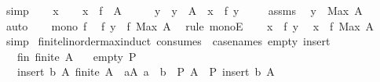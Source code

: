 \begin{isabellebody}
\ simp\isanewline
\ \ \isamarkupfalse%
\ x\isanewline
\ \ \isamarkupfalse%
\ {\isachardoublequoteopen}x\ {\isasymin}\ f\ {\isacharbackquote}{\kern0pt}\ A{\isachardoublequoteclose}\isanewline
\ \ \isamarkupfalse%
\ \isamarkupfalse%
\ y\ \ {\isachardoublequoteopen}y\ {\isasymin}\ A{\isachardoublequoteclose}\ \ {\isachardoublequoteopen}x\ {\isacharequal}{\kern0pt}\ f\ y{\isachardoublequoteclose}\ \isacommand{{\isachardot}{\kern0pt}{\isachardot}{\kern0pt}}\isamarkupfalse%
\isanewline
\ \ \isamarkupfalse%
\ assms\ \isamarkupfalse%
\ {\isachardoublequoteopen}y\ {\isasymle}\ Max\ A{\isachardoublequoteclose}\ \isamarkupfalse%
\ auto\isanewline
\ \ \isamarkupfalse%
\ {\isacartoucheopen}mono\ f{\isacartoucheclose}\ \isamarkupfalse%
\ {\isachardoublequoteopen}f\ y\ {\isasymle}\ f\ {\isacharparenleft}{\kern0pt}Max\ A{\isacharparenright}{\kern0pt}{\isachardoublequoteclose}\ \isamarkupfalse%
\ {\isacharparenleft}{\kern0pt}rule\ monoE{\isacharparenright}{\kern0pt}\isanewline
\ \ \isamarkupfalse%
\ {\isacartoucheopen}x\ {\isacharequal}{\kern0pt}\ f\ y{\isacartoucheclose}\ \isamarkupfalse%
\ {\isachardoublequoteopen}x\ {\isasymle}\ f\ {\isacharparenleft}{\kern0pt}Max\ A{\isacharparenright}{\kern0pt}{\isachardoublequoteclose}\ \isamarkupfalse%
\ simp\isanewline
{}\isamarkupfalse%
%
\endisatagproof
{\isafoldproof}%
%
\isadelimproof
\isanewline
%
\endisadelimproof
\isanewline
{}\isamarkupfalse%
\ finite{\isacharunderscore}{\kern0pt}linorder{\isacharunderscore}{\kern0pt}max{\isacharunderscore}{\kern0pt}induct\ {\isacharbrackleft}{\kern0pt}consumes\ {}{\isacharcomma}{\kern0pt}\ case{\isacharunderscore}{\kern0pt}names\ empty\ insert{\isacharbrackright}{\kern0pt}{\isacharcolon}{\kern0pt}\isanewline
\ \ \ fin{\isacharcolon}{\kern0pt}\ {\isachardoublequoteopen}finite\ A{\isachardoublequoteclose}\isanewline
\ \ \ empty{\isacharcolon}{\kern0pt}\ {\isachardoublequoteopen}P\ {\isacharbraceleft}{\kern0pt}{\isacharbraceright}{\kern0pt}{\isachardoublequoteclose}\ \isanewline
\ \ \ insert{\isacharcolon}{\kern0pt}\ {\isachardoublequoteopen}{\isasymAnd}b\ A{\isachardot}{\kern0pt}\ finite\ A\ {\isasymLongrightarrow}\ {\isasymforall}a{\isasymin}A{\isachardot}{\kern0pt}\ a\ {\isacharless}{\kern0pt}\ b\ {\isasymLongrightarrow}\ P\ A\ {\isasymLongrightarrow}\ P\ {\isacharparenleft}{\kern0pt}insert\ b\ A{\isacharparenright}{\kern0pt}{\isachardoublequoteclose}\isanewline

\end{isabellebody}

